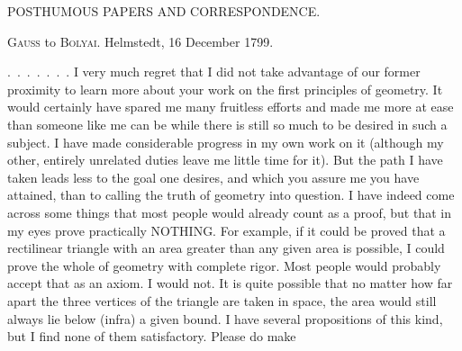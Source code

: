 \begin{center}
{\large POSTHUMOUS PAPERS AND CORRESPONDENCE.\par}
\end{center}

\bigskip
\begin{center}\textsc{Gauss} to \textsc{Bolyai}. Helmstedt, 16 December 1799.\end{center}

\medskip
.\, .\, .\, .\, .\, .\, . I very much regret that I did not take advantage of our former proximity to learn more about your work on the first principles of geometry. It would certainly have spared me many fruitless efforts and made me more at ease than someone like me can be while there is still so much to be desired in such a subject. I have made considerable progress in my own work on it (although my other, entirely unrelated duties leave me little time for it). But the path I have taken leads less to the goal one desires, and which you assure me you have attained, than to calling the truth of geometry into question. I have indeed come across some things that most people would already count as a proof, but that in my eyes prove practically NOTHING. For example, if it could be proved that a rectilinear triangle with an area greater than any given area is possible, I could prove the whole of geometry with complete rigor. Most people would probably accept that as an axiom. I would not. It is quite possible that no matter how far apart the three vertices of the triangle are taken in space, the area would still always lie below (infra) a given bound. I have several propositions of this kind, but I find none of them satisfactory. Please do make
